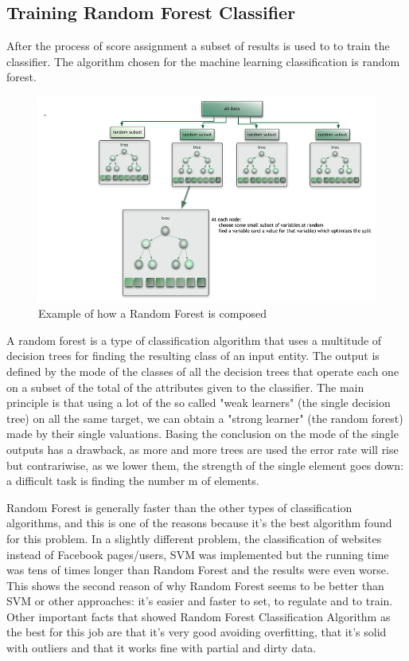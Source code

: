 \subsection{Training Random Forest Classifier}

After the process of score assignment a subset of results is used to to train the classifier. The algorithm chosen for the machine learning classification is random forest.

\begin{figure}
\centering
    \includegraphics[width=\columnwidth]{img/random_forest_small.jpg}
    \caption{Example of how a Random Forest is composed}
    \label{Fig.4}
\end{figure}

A random forest is a type of classification algorithm that uses a multitude of decision trees for finding the resulting class of an input entity. The output is defined by the mode of the classes of all the decision trees that operate each one on a subset of the total of the attributes given to the classifier. The main principle is that using a lot of the so called "weak learners" (the single decision tree) on all the same target, we can obtain a "strong learner" (the random forest) made by their single valuations. Basing the conclusion on the mode of the single outputs has a drawback, as more and more trees are used the error rate will rise but contrariwise, as we lower them, the strength of the single element goes down: a difficult task is finding the number m of elements.

Random Forest is generally faster than the other types of classification algorithms, and this is one of the reasons because it's the best algorithm found for this problem\cite{randomforest}. In a slightly different problem, the classification of websites instead of Facebook pages/users, SVM was implemented but the running time was tens of times longer than Random Forest and the results were even worse. This shows the second reason of why Random Forest seems to be better than SVM or other approaches: it's easier and faster to set, to regulate and to train.
Other important facts that showed Random Forest Classification Algorithm as the best for this job are that it's very good avoiding overfitting, that it's solid with outliers and that it works fine with partial and dirty data.

